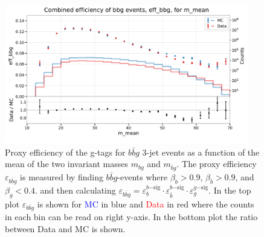 \begin{figure}
  \includegraphics[width=0.95\textwidth, trim=0 0 0 40, clip]{figures/quarks/eff_bbg_m_mean-down_sample=1.00-ML_vars=vertex-selection=b-ejet_min=4-n_iter_RS_lgb=99-n_iter_RS_xgb=9-cdot_cut=0.90-version=19.pdf}
  \caption[g-Tagging proxy efficiency for $b\bar{b}g$-events as function of the mean invariant mass]
          {Proxy efficiency of the g-tags for $b\bar{b}g$ 3-jet events as a function of the mean of the two invariant masses $m_{bg}$ and $m_{\bar{b}g}$. The proxy efficiency $\varepsilon_{b\bar{b}g}$ is measured by finding $b\bar{b}g$-events where $\beta_b > 0.9$, $\beta_{\bar{b}}>0.9$, and $\beta_g < 0.4$. and then calculating  $\varepsilon_{b\bar{b}g} = \varepsilon_b^{b\mathrm{-sig}} \cdot \varepsilon_{\bar{b}}^{b\mathrm{-sig}} \cdot  \varepsilon_g^{g\mathrm{-sig}} $. In the top plot $\varepsilon_{b\bar{b}g}$ is shown for \textcolor{blue}{MC} in blue and \textcolor{red}{Data} in red where the counts in each bin can be read on right y-axis. In the bottom plot the ratio between Data and MC is shown.
          } 
  \label{fig:q:effiency_btag_bbg_m_mean}
\end{figure}


